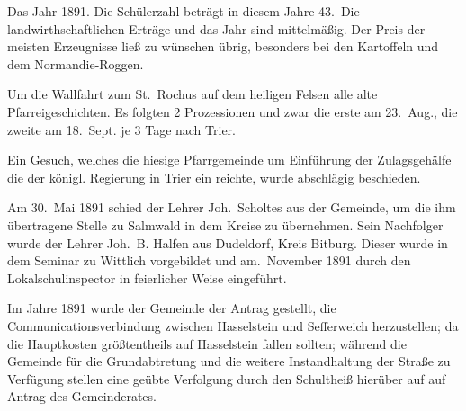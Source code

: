 

Das Jahr 1891.\ob
Die Schülerzahl beträgt in diesem Jahre 43.\ Die landwirthschaftlichen\ob
Erträge und das Jahr sind mittelmäßig. Der Preis der meisten\ob
Erzeugnisse ließ zu wünschen übrig, besonders bei den\ob
Kartoffeln und dem Normandie-Roggen.

\pend
{}
\pstart

Um die Wallfahrt zum St.\ Rochus auf dem heiligen Felsen alle\ob
alte Pfarreigeschichten. Es folgten 2 Prozessionen und\ob
zwar die erste am 23.\ Aug., die zweite am 18.\ Sept. je 3 Tage\ob
nach Trier.

Ein Gesuch, welches die hiesige Pfarrgemeinde um Einführung\ob
der Zulagsgehälfe die der königl. Regierung in Trier ein\ohb
reichte, wurde abschlägig beschieden.

Am 30.\ Mai 1891 schied der Lehrer Joh.\ Scholtes aus der Gemeinde,\ob
um die ihm übertragene Stelle zu Salmwald\unsicher{} in dem\ob
Kreise zu übernehmen. Sein Nachfolger wurde der Lehrer\ob
Joh.\ B. Halfen aus Dudeldorf, Kreis Bitburg. Dieser\ob
wurde in dem Seminar zu Wittlich vorgebildet und am.\ November 1891 durch den Lokalschulinspector in feierlicher\ob
Weise eingeführt.

Im Jahre 1891 wurde der Gemeinde der Antrag gestellt, die\ob
Communicationsverbindung zwischen Hasselstein und Sefferweich\ob
herzustellen; da die Hauptkosten größtentheils auf Hasselstein fallen\ob
sollten; während die Gemeinde für die Grundabtretung\ob
und die weitere Instandhaltung der Straße zu Verfügung stellen\ob
eine geübte Verfolgung durch den Schultheiß\unsicher{} hierüber auf\ob
auf Antrag des Gemeinderates.
\pend
